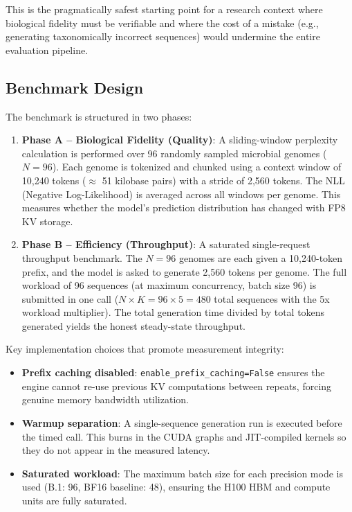 \documentclass[12pt]{article}
\begin{document}
This is the pragmatically safest starting point for a research context where biological fidelity must be verifiable and where the cost of a mistake (e.g., generating taxonomically incorrect sequences) would undermine the entire evaluation pipeline.

\subsection{Benchmark Design}

The benchmark is structured in two phases:

\begin{enumerate}
    \item \textbf{Phase A -- Biological Fidelity (Quality)}: A sliding-window perplexity calculation is performed over 96 randomly sampled microbial genomes ($N=96$). Each genome is tokenized and chunked using a context window of 10,240 tokens ($\approx$ 51 kilobase pairs) with a stride of 2,560 tokens. The NLL (Negative Log-Likelihood) is averaged across all windows per genome. This measures whether the model's prediction distribution has changed with FP8 KV storage.
    \item \textbf{Phase B -- Efficiency (Throughput)}: A saturated single-request throughput benchmark. The $N = 96$ genomes are each given a 10,240-token prefix, and the model is asked to generate 2,560 tokens per genome. The full workload of 96 sequences (at maximum concurrency, batch size 96) is submitted in one call ($N \times K = 96 \times 5 = 480$ total sequences with the 5x workload multiplier). The total generation time divided by total tokens generated yields the honest steady-state throughput.
\end{enumerate}

Key implementation choices that promote measurement integrity:
\begin{itemize}
    \item \textbf{Prefix caching disabled}: \texttt{enable\_prefix\_caching=False} ensures the engine cannot re-use previous KV computations between repeats, forcing genuine memory bandwidth utilization.
    \item \textbf{Warmup separation}: A single-sequence generation run is executed before the timed call. This burns in the CUDA graphs and JIT-compiled kernels so they do not appear in the measured latency.
    \item \textbf{Saturated workload}: The maximum batch size for each precision mode is used (B.1: 96, BF16 baseline: 48), ensuring the H100 HBM and compute units are fully saturated.
\end{itemize}
\end{document}
